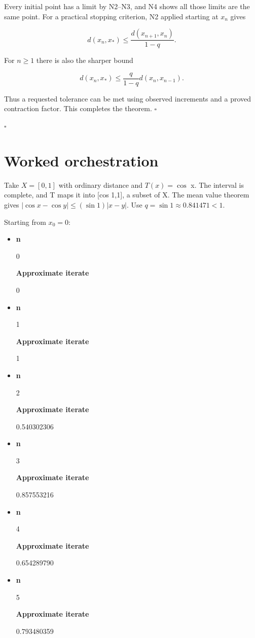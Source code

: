 \documentclass[preprint,12pt,aps,pra,showkeys,amsmath,amssymb,superscriptaddress,floatfix]{revtex4-2}
\theoremstyle{definition}
\theoremstyle{remark}
\begin{document}
Every initial point has a limit by N2--N3, and N4 shows all those limits
are the same point. For a practical stopping criterion, N2 applied
starting at \(x_n\) gives

\[d(x_n,x_*)\le\frac{d(x_{n+1},x_n)}{1-q}.\]

For \(n\ge 1\) there is also the sharper bound

\[d(x_n,x_*)\le\frac{q}{1-q}d(x_n,x_{n-1}).\]

Thus a requested tolerance can be met using observed increments and a
proved contraction factor. This completes the theorem. \(\square\)

\hfill$\square$

\section{Worked orchestration}

Take \(X=[0,1]\) with ordinary distance and \(T(x)=\operatorname{cos}\)
x. The interval is complete, and T maps it into {[}cos 1,1{]}, a subset
of X. The mean value theorem gives \(|\cos x-\cos y|\le(\sin1)|x-y|\).
Use \(q=\sin1\approx0.841471<1\).

Starting from \(x_0=0\):

\begin{itemize}
\item
  \textbf{n}

  0

  \textbf{Approximate iterate}

  0
\item
  \textbf{n}

  1

  \textbf{Approximate iterate}

  1
\item
  \textbf{n}

  2

  \textbf{Approximate iterate}

  0.540302306
\item
  \textbf{n}

  3

  \textbf{Approximate iterate}

  0.857553216
\item
  \textbf{n}

  4

  \textbf{Approximate iterate}

  0.654289790
\item
  \textbf{n}

  5

  \textbf{Approximate iterate}

  0.793480359
\end{itemize}
\end{document}
